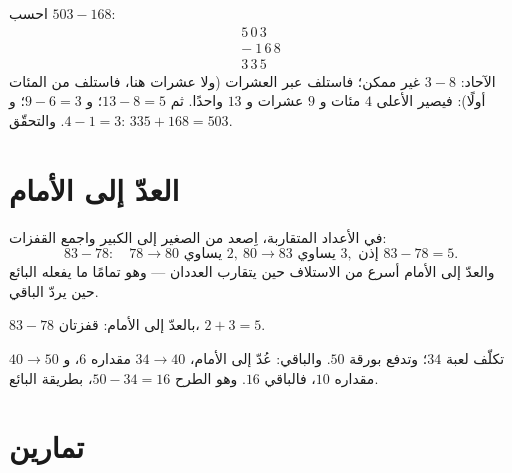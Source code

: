 \begin{example}\label{ex:g2:subtraction:worked}
احسب $503 - 168$:
\[
\begin{array}{r}
5\,0\,3 \\
-\ 1\,6\,8 \\
\hline
3\,3\,5
\end{array}
\]
الآحاد: $3 - 8$ غير ممكن؛ فاستلف عبر العشرات (ولا عشرات هنا،
فاستلف من المئات أولًا): فيصير الأعلى $4$ مئات و
$9$ عشرات و $13$ واحدًا. ثم $13 - 8 = 5$؛ و $9 - 6 = 3$؛
و $4 - 1 = 3$. والتحقّق: $335 + 168 = 503$. \checkmark
\end{example}

\section{العدّ إلى الأمام}

\begin{method}\label{met:g2:subtraction:countup}
في الأعداد المتقاربة، اِصعد من الصغير إلى الكبير واجمع
القفزات:
\[
83 - 78: \quad 78 \to 80 \text{ يساوي } 2, \ 80 \to 83 \text{ يساوي } 3,
\text{ إذن } 83 - 78 = 5 .
\]
والعدّ إلى الأمام أسرع من الاستلاف حين يتقارب العددان --- وهو
تمامًا ما يفعله البائع حين يردّ الباقي.
\end{method}

\begin{omfigure}

{\small $83 - 78$ بالعدّ إلى الأمام: قفزتان، $2 + 3 = 5$.}
\end{omfigure}

\begin{example}[ردّ الباقي]\label{ex:g2:subtraction:change}
تكلّف لعبة $34$؛ وتدفع بورقة $50$. والباقي: عُدّ إلى الأمام،
$34 \to 40$ مقداره $6$، و $40 \to 50$ مقداره $10$، فالباقي $16$.
وهو الطرح $50 - 34 = 16$، بطريقة البائع.
\end{example}

\section{تمارين}


